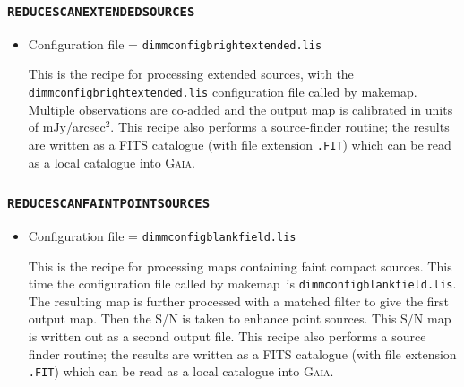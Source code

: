 \documentclass[twoside,11pt]{article}
\newcommand{\xref}[3]{#1}
\newcommand{\xlabel}[1]{}
\renewcommand{\_}{\texttt{\symbol{95}}}
\newcommand{\gaia}{\xref{\textsc{Gaia}}{sun214}{}}
\newcommand{\drrecipe}[1]{\texttt{#1}}
\newcommand{\task}[1]{\textsf{#1}}
\newcommand{\file}[1]{\texttt{#1}}
\newcommand{\makemap}{\xref{\task{makemap}}{sun258}{MAKEMAP}}
\begin{document}
\subsubsection{\xlabel{extsources}\drrecipe{REDUCE\_SCAN\_EXTENDED\_SOURCES}}
\begin{itemize}
\item  Configuration file = \file{dimmconfig\_bright\_extended.lis}

This is the recipe for processing extended sources, with the
\file{dimmconfig\_bright\_extended.lis} configuration file called by
\makemap. Multiple observations are co-added and the output
map is calibrated in units of mJy/arcsec$^2$. This recipe also
performs a source-finder routine; the results are written as a FITS
catalogue (with file extension \file{.FIT}) which can be read as a
local catalogue into \gaia.
\end{itemize}

\subsubsection{\xlabel{faint}\drrecipe{REDUCE\_SCAN\_FAINT\_POINT\_SOURCES}}
\begin{itemize}
\item  Configuration file = \file{dimmconfig\_blank\_field.lis}

This is the recipe for processing maps containing faint compact
sources. This time the configuration file called by \makemap\
is \file{dimmconfig\_blank\_field.lis}. The resulting map is further
processed with a matched filter to give the first output map. Then the
S/N is taken to enhance point sources.  This
S/N map is written out as a second output file. This
recipe also performs a source finder routine; the results are written
as a FITS catalogue (with file extension \file{.FIT}) which can be
read as a local catalogue into \gaia.
\end{itemize}
\end{document}
